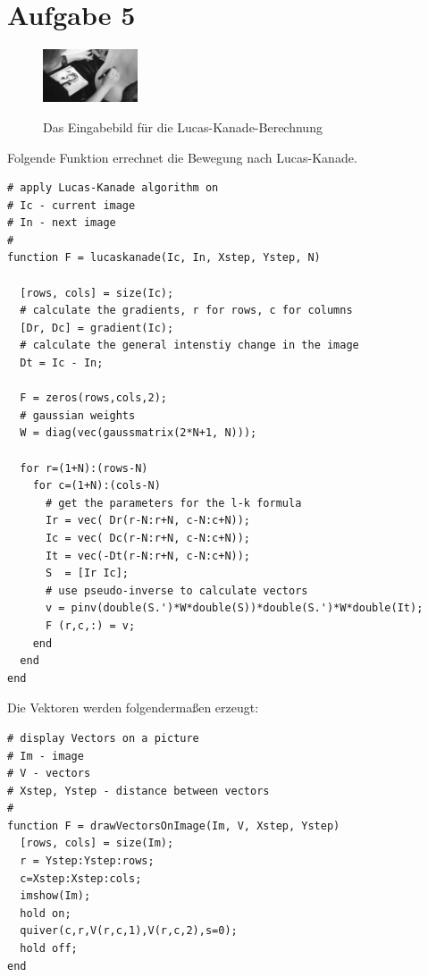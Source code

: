 




\newcommand{\nr}{3}


\section*{Aufgabe 5}

\begin{figure}[htpb]
\begin{center}
{\includegraphics[width=0.25\textwidth]{samples/mrs.easy/101.png}}
\end{center}
\caption{Das Eingabebild für die Lucas-Kanade-Berechnung }
\label{fig:u03-picture}
\end{figure}

Folgende Funktion errechnet die Bewegung nach Lucas-Kanade.

\lstset{language=matlab}
\begin{lstlisting}[caption={Berechnung Lucas-Kanade}]
# apply Lucas-Kanade algorithm on
# Ic - current image
# In - next image
# 
function F = lucaskanade(Ic, In, Xstep, Ystep, N)

  [rows, cols] = size(Ic);
  # calculate the gradients, r for rows, c for columns
  [Dr, Dc] = gradient(Ic);
  # calculate the general intenstiy change in the image
  Dt = Ic - In;

  F = zeros(rows,cols,2);
  # gaussian weights
  W = diag(vec(gaussmatrix(2*N+1, N)));

  for r=(1+N):(rows-N)
    for c=(1+N):(cols-N)
      # get the parameters for the l-k formula
      Ir = vec( Dr(r-N:r+N, c-N:c+N));
      Ic = vec( Dc(r-N:r+N, c-N:c+N));
      It = vec(-Dt(r-N:r+N, c-N:c+N));
      S  = [Ir Ic];
      # use pseudo-inverse to calculate vectors
      v = pinv(double(S.')*W*double(S))*double(S.')*W*double(It);
      F (r,c,:) = v;
    end
  end
end
\end{lstlisting}

Die Vektoren werden folgendermaßen erzeugt:

\lstset{language=matlab}
\begin{lstlisting}[caption={Zeichnen der Vektoren}]
# display Vectors on a picture
# Im - image
# V - vectors
# Xstep, Ystep - distance between vectors
# 
function F = drawVectorsOnImage(Im, V, Xstep, Ystep)
  [rows, cols] = size(Im);
  r = Ystep:Ystep:rows;  
  c=Xstep:Xstep:cols;
  imshow(Im);
  hold on;
  quiver(c,r,V(r,c,1),V(r,c,2),s=0);
  hold off;
end
\end{lstlisting}

